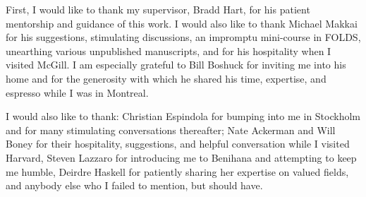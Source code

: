 First, I would like to thank my supervisor, Bradd Hart, for his patient mentorship and guidance of this work. I would also like to thank Michael Makkai for his suggestions, stimulating discussions, an impromptu mini-course in FOLDS, unearthing various unpublished manuscripts, and for his hospitality when I visited McGill. I am especially grateful to Bill Boshuck for inviting me into his home and for the generosity with which he shared his time, expertise, and espresso while I was in Montreal.

I would also like to thank: Christian Espindola for bumping into me in Stockholm and for many stimulating conversations thereafter; Nate Ackerman and Will Boney for their hospitality,  suggestions, and helpful conversation while I visited Harvard, Steven Lazzaro for introducing me to Benihana and attempting to keep me humble, Deirdre Haskell for patiently sharing her expertise on valued fields, and anybody else who I failed to mention, but should have.